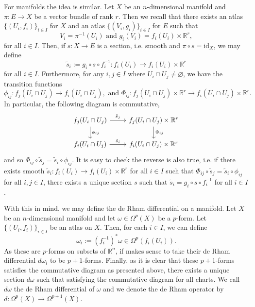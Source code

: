 \documentclass[]{article}
\theoremstyle{definition}
\theoremstyle{definition}
\begin{document}
For manifolds the idea is similar. Let \(X\) be an \(n\)-dimensional manifold 
and \(\pi : E \to X\) be a vector bundle of rank \(r\). Then we recall that 
there exists an atlas \(\{(U_i, f_i)\}_{i \in I}\) for \(X\) and an atlas 
\(\{(V_i, g_i)\}_{i \in I}\) for \(E\) such that 
\[V_i = \pi^{-1}(U_i) \text{ and } g_i(V_i) = f_i(U_i) \times \mathbb{R}^r,\]
for all \(i \in I\). Then, if \(s : X \to E\) is a section, i.e. 
smooth and \(\pi \circ s = \text{id}_X\), we may define 
\[\tilde s_i := g_i \circ s \circ f_i^{-1} : f_i(U_i) \to f_i(U_i) \times \mathbb{R}^r\]
for all \(i \in I\). Furthermore, for any \(i, j \in I\) where \(U_i \cap U_j \neq 
\varnothing\), we have the transition functions 
\[\phi_{ij} : f_j(U_i \cap U_j) \to f_i(U_i \cap U_j), \text{ and } 
  \Phi_{ij} : f_j(U_i \cap U_j) \times \mathbb{R}^r \to 
    f_i(U_i \cap U_j) \times \mathbb{R}^r.\]
In particular, the following diagram is commutative,
\[\begin{tikzcd}
  f_j(U_i \cap U_j) \arrow{r}{\tilde s_j} 
    \arrow{d}{\phi_{ij}} & f_j(U_i \cap U_j) \times \mathbb{R}^r 
    \arrow{d}{\Phi_{ij}} \\
  f_i(U_i \cap U_j) \arrow{r}{\tilde s_i} & 
  f_i(U_i \cap U_j) \times \mathbb{R}^r
\end{tikzcd}\]
and so \(\Phi_{ij} \circ \tilde s_j = \tilde s_i \circ \phi_{ij}\).
It is easy to check the reverse is also true, i.e. if there exists smooth
\(\tilde s_i : f_i(U_i) \to f_i(U_i) \times \mathbb{R}^r\) for all 
\(i \in I\) such that \(\Phi_{ij} \circ \tilde s_j = \tilde s_i \circ \phi_{ij}\) 
for all \(i, j \in I\), there exists a unique section \(s\) such that 
\(\tilde s_i = g_i \circ s \circ f_i^{-1}\) for all \(i \in I\).

With this in mind, we may define the de Rham differential on a manifold. 
Let \(X\) be an \(n\)-dimensional manifold and let \(\omega \in \Omega^p(X)\) 
be a \(p\)-form. Let \(\{(U_i, f_i)\}_{i \in I}\) be an atlas on \(X\). 
Then, for each \(i \in I\), we can define 
\[\omega_i := (f_i^{-1})^* \omega \in \Omega^p(f_i(U_i)).\]
As these are \(p\)-forms on subsets of \(\mathbb{R}^n\), if makes sense 
to take their de Rham differential \(d\omega_i\) to be \(p + 1\)-forms.
Finally, as it is clear that these \(p + 1\)-forms satisfies the commutative 
diagram as presented above, there exists a unique section \(d\omega\) 
such that satisfying the commutative diagram for all charts. We call 
\(d\omega\) the de Rham differential of \(\omega\) and we denote the 
de Rham operator by \(d : \Omega^p(X) \to \Omega^{p + 1}(X)\).
\end{document}
